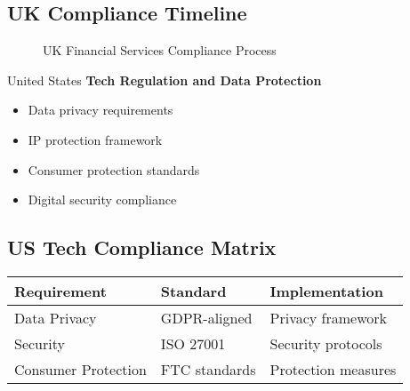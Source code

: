 \subsection{UK Compliance Timeline}
\begin{figure}[htbp]
    \centering
    \caption{UK Financial Services Compliance Process}
    \label{fig:uk-compliance}
\end{figure}

\begin{regionalbox}{United States}
\textbf{Tech Regulation and Data Protection}
\begin{itemize}
    \item Data privacy requirements
    \item IP protection framework
    \item Consumer protection standards
    \item Digital security compliance
\end{itemize}

\subsection{US Tech Compliance Matrix}
\begin{center}
\begin{tabularx}{\textwidth}{>{\raggedright\arraybackslash}X >{\centering\arraybackslash}X >{\raggedright\arraybackslash}X}
    \toprule
    \textbf{Requirement} & \textbf{Standard} & \textbf{Implementation} \\
    \midrule
    Data Privacy & GDPR-aligned & Privacy framework \\
    Security & ISO 27001 & Security protocols \\
    Consumer Protection & FTC standards & Protection measures \\
    \bottomrule
\end{tabularx}
\end{center}
\end{regionalbox}

